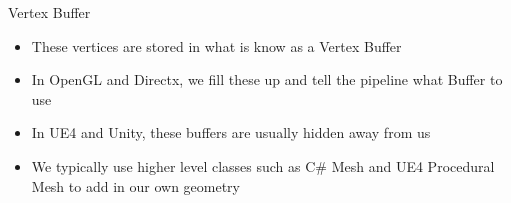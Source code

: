 \begin{frame}{Vertex Buffer}
	\begin{itemize}
		\item These vertices are stored in what is know as a Vertex Buffer
		\pause \item In OpenGL and Directx, we fill these up and tell the pipeline what Buffer to use
		\pause \item In UE4 and Unity, these buffers are usually hidden away from us
		\pause \item We typically use higher level classes such as C\# Mesh and UE4 Procedural Mesh to add in our own geometry 
	\end{itemize}
\end{frame}


